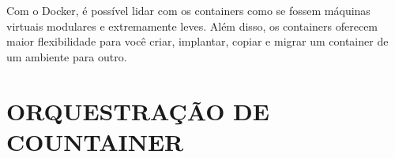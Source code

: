 Com o Docker, é possível lidar com os containers como se fossem máquinas virtuais modulares e extremamente leves. Além disso, os containers oferecem maior flexibilidade para você criar, implantar, copiar e migrar um container de um ambiente para outro.

\section{ORQUESTRAÇÃO DE COUNTAINER}
\label{sec:orquestracao}
